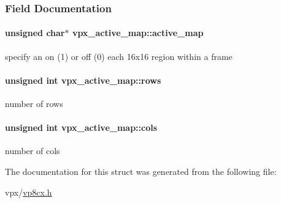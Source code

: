 \subsubsection{Field Documentation}
\hypertarget{structvpx__active__map_a6e5e092e766ae3f65d280c68c9f6df82}{
\paragraph[{active\-\_\-map}]{\setlength{\rightskip}{0pt plus 5cm}unsigned char$\ast$ vpx\-\_\-active\-\_\-map\-::active\-\_\-map}}\label{structvpx__active__map_a6e5e092e766ae3f65d280c68c9f6df82}
specify an on (1) or off (0) each 16x16 region within a frame \hypertarget{structvpx__active__map_a29424c92ff201f97db9bf62d16dfab4d}{
\paragraph[{rows}]{\setlength{\rightskip}{0pt plus 5cm}unsigned int vpx\-\_\-active\-\_\-map\-::rows}}\label{structvpx__active__map_a29424c92ff201f97db9bf62d16dfab4d}
number of rows \hypertarget{structvpx__active__map_a310edb5efc62d596b2c276e3f7d1b42a}{
\paragraph[{cols}]{\setlength{\rightskip}{0pt plus 5cm}unsigned int vpx\-\_\-active\-\_\-map\-::cols}}\label{structvpx__active__map_a310edb5efc62d596b2c276e3f7d1b42a}
number of cols 

The documentation for this struct was generated from the following file\-:\begin{DoxyCompactItemize}
\item 
vpx/\hyperlink{vp8cx_8h}{vp8cx.\-h}\end{DoxyCompactItemize}
